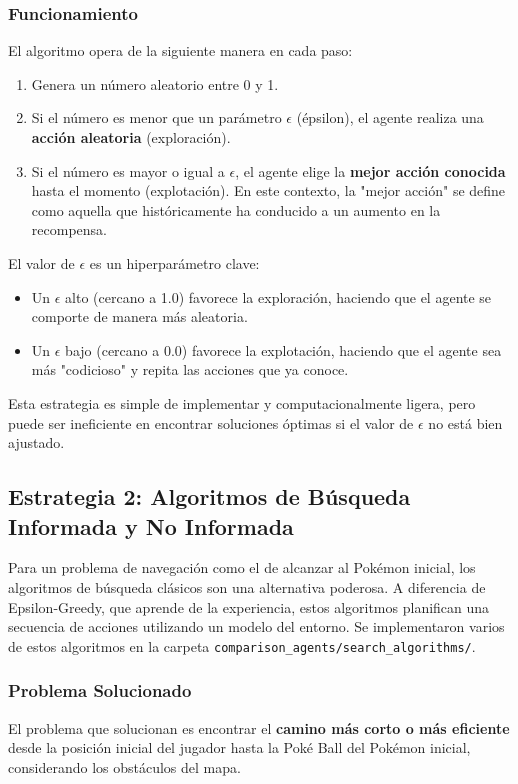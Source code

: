 \documentclass[12pt, oneside, openany]{book}
\begin{document}
\subsubsection{Funcionamiento}
El algoritmo opera de la siguiente manera en cada paso:
\begin{enumerate}
    \item Genera un número aleatorio entre 0 y 1.
    \item Si el número es menor que un parámetro $\epsilon$ (épsilon), el agente realiza una \textbf{acción aleatoria} (exploración).
    \item Si el número es mayor o igual a $\epsilon$, el agente elige la \textbf{mejor acción conocida} hasta el momento (explotación). En este contexto, la "mejor acción" se define como aquella que históricamente ha conducido a un aumento en la recompensa.
\end{enumerate}
El valor de $\epsilon$ es un hiperparámetro clave:
\begin{itemize}
    \item Un $\epsilon$ alto (cercano a 1.0) favorece la exploración, haciendo que el agente se comporte de manera más aleatoria.
    \item Un $\epsilon$ bajo (cercano a 0.0) favorece la explotación, haciendo que el agente sea más "codicioso" y repita las acciones que ya conoce.
\end{itemize}

Esta estrategia es simple de implementar y computacionalmente ligera, pero puede ser ineficiente en encontrar soluciones óptimas si el valor de $\epsilon$ no está bien ajustado.

\subsection{Estrategia 2: Algoritmos de Búsqueda Informada y No Informada}
Para un problema de navegación como el de alcanzar al Pokémon inicial, los algoritmos de búsqueda clásicos son una alternativa poderosa. A diferencia de Epsilon-Greedy, que aprende de la experiencia, estos algoritmos planifican una secuencia de acciones utilizando un modelo del entorno. Se implementaron varios de estos algoritmos en la carpeta \texttt{comparison\_agents/search\_algorithms/}.

\subsubsection{Problema Solucionado}
El problema que solucionan es encontrar el \textbf{camino más corto o más eficiente} desde la posición inicial del jugador hasta la Poké Ball del Pokémon inicial, considerando los obstáculos del mapa.
\end{document}
